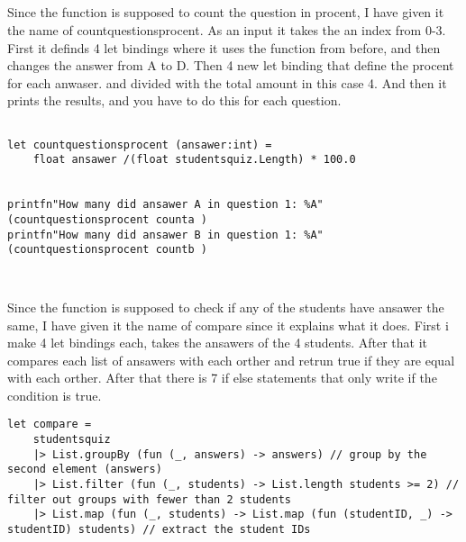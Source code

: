 \documentclass{article}
\begin{document}
\subsection{}

Since the function is supposed to count the question in procent, I have given it the name of countquestionsprocent. As an input it takes the an index from 0-3. First it definds 4 let bindings where it uses the function from before, and then changes the answer from A to D. Then 4 new let binding that define the procent for each anwaser. and divided with the total amount in this case 4. And then it prints the results, and you have to do this for each question.
 \begin{lstlisting}

let countquestionsprocent (ansawer:int) = 
    float ansawer /(float studentsquiz.Length) * 100.0 


printfn"How many did ansawer A in question 1: %A" (countquestionsprocent counta )
printfn"How many did ansawer B in question 1: %A" (countquestionsprocent countb )


    \end{lstlisting}


\subsection{}

Since the function is supposed to check if any of the students have ansawer the same,  I have given it the name of compare since it explains what it does. First i make 4 let bindings each, takes the ansawers of the 4 students. After that it compares each list of ansawers with each orther and retrun true if they are equal with each orther. After that there is 7 if else statements that only write if the condition is true.


 \begin{lstlisting}
let compare = 
    studentsquiz
    |> List.groupBy (fun (_, answers) -> answers) // group by the second element (answers)
    |> List.filter (fun (_, students) -> List.length students >= 2) // filter out groups with fewer than 2 students
    |> List.map (fun (_, students) -> List.map (fun (studentID, _) -> studentID) students) // extract the student IDs

    \end{lstlisting}



\section{}
\end{document}
